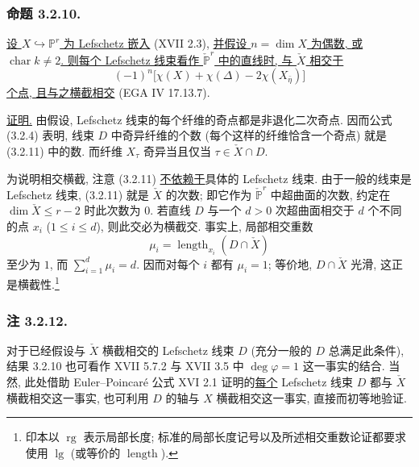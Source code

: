 \subsubsection*{命题 3.2.10.}
\underline{设 $X\hookrightarrow\mathbb P^r$ 为 Lefschetz 嵌入}
(XVII 2.3), \underline{并假设 $n=\dim X$ 为偶数, 或 $\operatorname{char}k\ne2$. 则每个 Lefschetz 线束看作 $\check{\mathbb P}^{r}$ 中的直线时, 与 $\check X$ 相交于}
\begin{equation}\tag{3.2.11}
(-1)^n\bigl[\chi(X)+\chi(\Delta)-2\chi(X_{\bar\eta})\bigr]
\end{equation}
\underline{个点, 且与之横截相交} (EGA IV 17.13.7).

\underline{证明.}
由假设, Lefschetz 线束的每个纤维的奇点都是非退化二次奇点. 因而公式 (3.2.4) 表明, 线束 $D$ 中奇异纤维的个数 (每个这样的纤维恰含一个奇点) 就是 (3.2.11) 中的数. 而纤维 $X_\tau$ 奇异当且仅当 $\tau\in\check X\cap D$.

为说明相交横截, 注意 (3.2.11) \underline{不依赖于}具体的 Lefschetz 线束. 由于一般的线束是 Lefschetz 线束, (3.2.11) 就是 $\check X$ 的次数; 即它作为 $\check{\mathbb P}^{r}$ 中超曲面的次数, 约定在 $\dim\check X\le r-2$ 时此次数为 $0$. 若直线 $D$ 与一个 $d>0$ 次超曲面相交于 $d$ 个不同的点 $x_i$ ($1\le i\le d$), 则此交必为横截交. 事实上, 局部相交重数
\[
\mu_i=\operatorname{length}_{x_i}(D\cap\check X)
\]
至少为 $1$, 而 $\sum_{i=1}^d\mu_i=d$. 因而对每个 $i$ 都有 $\mu_i=1$; 等价地, $D\cap\check X$ 光滑, 这正是横截性.\footnote{印本以 $\operatorname{rg}$ 表示局部长度; 标准的局部长度记号以及所述相交重数论证都要求使用 $\operatorname{lg}$ (或等价的 $\operatorname{length}$).}

\subsubsection*{注 3.2.12.}
对于已经假设与 $\check X$ 横截相交的 Lefschetz 线束 $D$ (充分一般的 $D$ 总满足此条件), 结果 3.2.10 也可看作 XVII 5.7.2 与 XVII 3.5 中 $\deg\varphi=1$ 这一事实的结合. 当然, 此处借助 Euler--Poincar\'e 公式 XVI 2.1 证明的\underline{每个} Lefschetz 线束 $D$ 都与 $\check X$ 横截相交这一事实, 也可利用 $D$ 的轴与 $X$ 横截相交这一事实, 直接而初等地验证.
